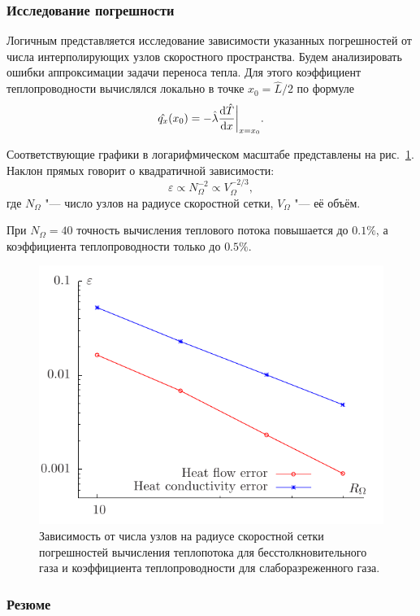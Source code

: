 \subsubsection{Исследование погрешности}

Логичным представляется исследование зависимости указанных погрешностей от числа интерполирующих узлов
скоростного пространства. Будем анализировать ошибки аппроксимации задачи переноса тепла.
Для этого коэффициент теплопроводности вычислялся локально в точке \(x_0=\hat L/2\) по формуле
\[ \hat{q_x}(x_0) = -\hat{\lambda}\frac{\mathrm{d}\hat T}{\mathrm{d} x}\bigg|_{x=x_0}. \]

Соответствующие графики в логарифмическом масштабе представлены на рис.~\ref{fig:error}.
Наклон прямых говорит о квадратичной зависимости:
\[ \varepsilon \propto N_\Omega^{-2} \propto V_\Omega^{-2/3}, \]
где \(N_\Omega\) "--- число узлов на радиусе скоростной сетки, \(V_\Omega\) "--- её объём.

При \(N_\Omega = 40\) точность вычисления теплового потока повышается до \(0.1\%\),
а коэффициента теплопроводности только до \(0.5\%\).

\begin{figure}
	\centering
	\includegraphics{problems/error.pdf}
	\caption{
		Зависимость от числа узлов на радиусе скоростной сетки погрешностей вычисления 
		теплопотока для бесстолкновительного газа и коэффициента теплопроводности для слаборазреженного газа.
	}\label{fig:error}
\end{figure}

\subsubsection{Резюме}

